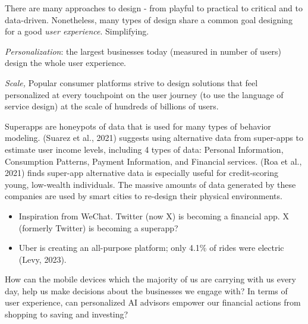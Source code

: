 \documentclass[
  letterpaper,
  DIV=11,
  numbers=noendperiod]{scrartcl}
\begin{document}
There are many approaches to design - from playful to practical to
critical and to data-driven. Nonetheless, many types of design share a
common goal designing for a good \emph{user experience}. Simplifying.

\emph{Personalization}: the largest businesses today (measured in number
of users) design the whole user experience.

\emph{Scale,} Popular consumer platforms strive to design solutions that
feel personalized at every touchpoint on the user journey (to use the
language of service design) at the scale of hundreds of billions of
users.

Superapps are honeypots of data that is used for many types of behavior
modeling. (Suarez et al., 2021) suggests using alternative data from
super-apps to estimate user income levels, including 4 types of data:
Personal Information, Consumption Patterns, Payment Information, and
Financial services. (Roa et al., 2021) finds super-app alternative data
is especially useful for credit-scoring young, low-wealth individuals.
The massive amounts of data generated by these companies are used by
smart cities to re-design their physical environments.

\begin{itemize}
\item
  Inspiration from WeChat. Twitter (now X) is becoming a financial app.
  X (formerly Twitter) is becoming a superapp?
\item
  Uber is creating an all-purpose platform; only 4.1\% of rides were
  electric (Levy, 2023).
\end{itemize}

How can the mobile devices which the majority of us are carrying with us
every day, help us make decisions about the businesses we engage with?
In terms of user experience, can personalized AI advisors empower our
financial actions from shopping to saving and investing?
\end{document}

